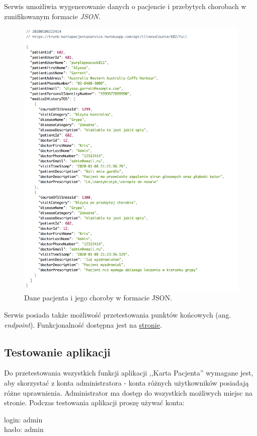 Serwis umożliwia wygenerowanie danych o pacjencie i przebytych chorobach w zunifikowanym formacie \textit{JSON}. 
\begin{figure}[H]
\centering
\includegraphics[width=15cm]{pictures/service/07-json_normal}
\caption{Dane pacjenta i jego choroby w formacie JSON.}
\end{figure}

Serwis posiada także możliwość przetestowania punktów końcowych (ang. \textit{endpoint}). Funkcjonalność dostępna jest na  \href{https://trunk-kartapacjentaservice.herokuapp.com/swagger-ui.html#/}{stronie}.

\subsection{Testowanie aplikacji}
Do przetestowania wszystkich funkcji aplikacji ,,Karta Pacjenta'' wymagane jest, aby skorzystać z konta administratora - konta różnych użytkowników posiadają różne uprawnienia. Administrator ma dostęp do wszystkich możliwych miejsc na stronie. Podczas testowania aplikacji proszę używać konta:\\
\begin{center}
\label{credentials}
login: admin\\
hasło: admin
\end{center}